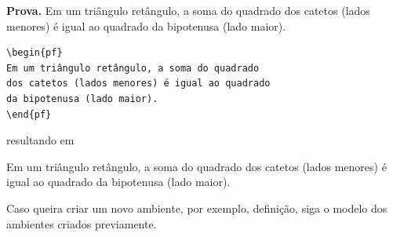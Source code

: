 \documentclass[a4paper]{ifacconf}
\newenvironment{prova}{{\bf Prova.}}{ }
\begin{document}
\begin{prova}    %
Em um triângulo retângulo, a soma do quadrado dos catetos (lados menores) é igual ao quadrado da bipotenusa (lado maior). 
\end{prova}
\else
\begin{verbatim}
\begin{pf}
Em um triângulo retângulo, a soma do quadrado 
dos catetos (lados menores) é igual ao quadrado 
da bipotenusa (lado maior). 
\end{pf}
\end{verbatim}
resultando em

\begin{pf}    %
Em um triângulo retângulo, a soma do quadrado dos catetos (lados menores) é igual ao quadrado da bipotenusa (lado maior). 
\end{pf}
\fi

Caso queira criar um novo ambiente, por exemplo, definição, siga o modelo dos ambientes 
criados previamente.


\end{document}
